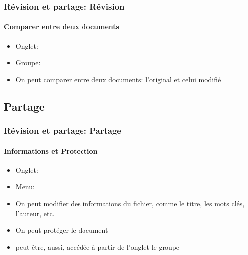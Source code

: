 \documentclass[xcolor=table]{beamer}
\begin{document}
\begin{frame}
\frametitle{Révision et partage: Révision}
\framesubtitle{Comparer entre deux documents}

\begin{minipage}{0.41\textwidth}
	\begin{itemize}
		\item Onglet: 
		\item Groupe: 
		\item On peut comparer entre deux documents: l'original et celui modifié 
	\end{itemize}
\end{minipage}
\begin{minipage}{0.58\textwidth}
	
	
\end{minipage}

\end{frame}

\subsection{Partage}

%
%

\begin{frame}
\frametitle{Révision et partage: Partage}
\framesubtitle{Informations et Protection}

\begin{minipage}{0.41\textwidth}
	\begin{itemize}
		\item Onglet: 
		\item Menu: 
		\item On peut modifier des informations du fichier, comme le titre, les mots clés, l'auteur, etc. 
		\item On peut protéger le document
		\item {} peut être, aussi, accédée à partir de l'onglet  le groupe 
	\end{itemize}
\end{minipage}
\begin{minipage}{0.58\textwidth}
\end{minipage}

\end{frame}
\end{document}
